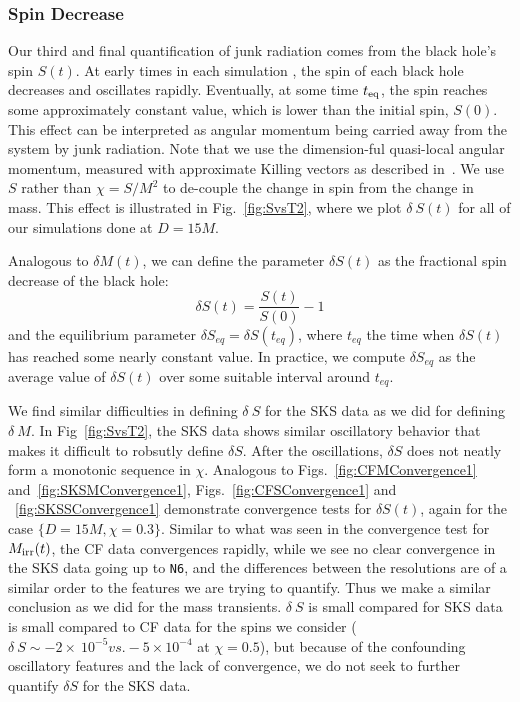 \subsubsection{Spin Decrease}

Our third and final quantification of junk radiation comes from the
black hole's spin $S(t)$. At early times in each simulation 
, the spin
of each black hole decreases and oscillates rapidly. Eventually, at
some time $t_{\rm eq}$, the spin reaches some approximately constant
value, which is lower than the initial spin, $S(0)$. This effect can
be interpreted as angular momentum being carried away from the system
by junk radiation. Note that we use the dimension-ful quasi-local
angular momentum, measured with approximate Killing vectors as
described in~\cite{Lovelace2008}. We use $S$ rather than $\chi=S/M^2$
to de-couple the change in spin from the change in mass. This effect
is illustrated in Fig.~\ref{fig:SvsT2}, where we plot $\delta~S(t)$
for all of our simulations done at $D=15M$.

Analogous to $\delta M(t)$, we can define the parameter $\delta S(t)$ as the
fractional spin decrease of the black hole:
\begin{equation}
\delta S(t)=\frac{S(t)}{S(0)} - 1
\end{equation}
and the equilibrium parameter $\delta S_{eq}=\delta S(t_{eq})$, where $t_{eq}$ the
time when $\delta S(t)$ has reached some nearly constant value.
In practice, we compute $\delta S_{eq}$ as the average value of
$\delta S(t)$
over some suitable interval around $t_{eq}$.

We find similar difficulties in defining $\delta~S$ for the SKS data
as we did for defining $\delta~M$. In Fig~\ref{fig:SvsT2}, the SKS
data shows similar oscillatory behavior that makes it difficult to
robsutly define $\delta S$. After the oscillations, $\delta S$ does
not neatly form a monotonic sequence in $\chi$.
Analogous to Figs.~\ref{fig:CFMConvergence1}
and~\ref{fig:SKSMConvergence1}, Figs.~\ref{fig:CFSConvergence1} and
~\ref{fig:SKSSConvergence1} demonstrate convergence tests for $\delta
S(t)$, again for the case $\{D=15M,\chi=0.3\}$. Similar to what was seen
in the convergence test for $M_{\rm irr}(t)$, the CF data convergences
rapidly, while we see no clear convergence in the SKS data going up to
{\tt N6}, and the differences between the resolutions are of a similar
order to the features we are trying to quantify. Thus we make a
similar conclusion as we did for the mass transients. $\delta~S$ is
small compared for SKS data is small compared to CF data for the spins
we consider ($\delta~S\sim-2\times~10^{-5} vs. -5\times10^{-4}$ at
$\chi=0.5$), but because of the confounding oscillatory features and
the lack of convergence, we do not seek to further quantify $\delta S$
for the SKS data.

